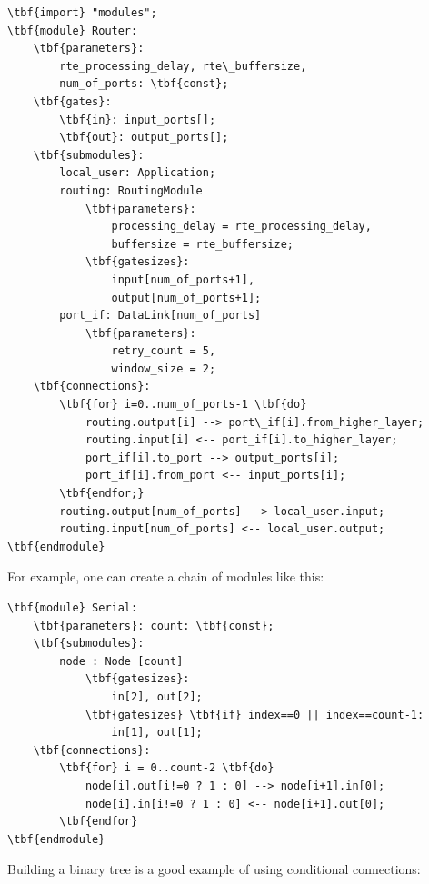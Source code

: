 \begin{Verbatim}[commandchars=\\\{\}]
\tbf{import} "modules";
\tbf{module} Router:
    \tbf{parameters}:
        rte_processing_delay, rte\_buffersize,
        num_of_ports: \tbf{const};
    \tbf{gates}:
        \tbf{in}: input_ports[];
        \tbf{out}: output_ports[];
    \tbf{submodules}:
        local_user: Application;
        routing: RoutingModule
            \tbf{parameters}:
                processing_delay = rte_processing_delay,
                buffersize = rte_buffersize;
            \tbf{gatesizes}:
                input[num_of_ports+1],
                output[num_of_ports+1];
        port_if: DataLink[num_of_ports]
            \tbf{parameters}:
                retry_count = 5,
                window_size = 2;
    \tbf{connections}:
        \tbf{for} i=0..num_of_ports-1 \tbf{do}
            routing.output[i] --> port\_if[i].from_higher_layer;
            routing.input[i] <-- port_if[i].to_higher_layer;
            port_if[i].to_port --> output_ports[i];
            port_if[i].from_port <-- input_ports[i];
        \tbf{endfor;}
        routing.output[num_of_ports] --> local_user.input;
        routing.input[num_of_ports] <-- local_user.output;
\tbf{endmodule}
\end{Verbatim}




For example, one can create a chain of modules like this:


\begin{Verbatim}[commandchars=\\\{\}]
\tbf{module} Serial:
    \tbf{parameters}: count: \tbf{const};
    \tbf{submodules}:
        node : Node [count]
            \tbf{gatesizes}:
                in[2], out[2];
            \tbf{gatesizes} \tbf{if} index==0 || index==count-1:
                in[1], out[1];
    \tbf{connections}:
        \tbf{for} i = 0..count-2 \tbf{do}
            node[i].out[i!=0 ? 1 : 0] --> node[i+1].in[0];
            node[i].in[i!=0 ? 1 : 0] <-- node[i+1].out[0];
        \tbf{endfor}
\tbf{endmodule}
\end{Verbatim}




Building a binary tree is a good example of using conditional 
connections:


